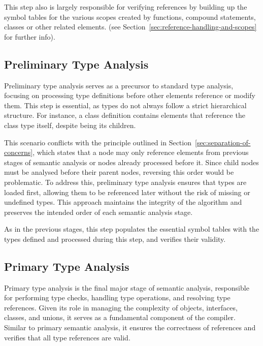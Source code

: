 This step also is largely responsible for verifying references by building up the symbol tables for the various scopes created by functions, compound statements, classes or other related elements. (see Section~\ref{sec:reference-handling-and-scopes} for further info). 

\subsection{Preliminary Type Analysis}
\label{sec:preliminary-type-analysis}

Preliminary type analysis serves as a precursor to standard type analysis, focusing on processing type definitions before other elements reference or modify them. This step is essential, as types do not always follow a strict hierarchical structure. For instance, a class definition contains elements that reference the class type itself, despite being its children.

This scenario conflicts with the principle outlined in Section~\ref{sec:separation-of-concerns}, which states that a node may only reference elements from previous stages of semantic analysis or nodes already processed before it. Since child nodes must be analysed before their parent nodes, reversing this order would be problematic. To address this, preliminary type analysis ensures that types are loaded first, allowing them to be referenced later without the risk of missing or undefined types. This approach maintains the integrity of the algorithm and preserves the intended order of each semantic analysis stage.

As in the previous stages, this step populates the essential symbol tables with the types defined and processed during this step, and verifies their validity.

\subsection{Primary Type Analysis}
\label{sec:primary-type-analysis}

Primary type analysis is the final major stage of semantic analysis, responsible for performing type checks, handling type operations, and resolving type references. Given its role in managing the complexity of objects, interfaces, classes, and unions, it serves as a fundamental component of the compiler. Similar to primary semantic analysis, it ensures the correctness of references and verifies that all type references are valid.

